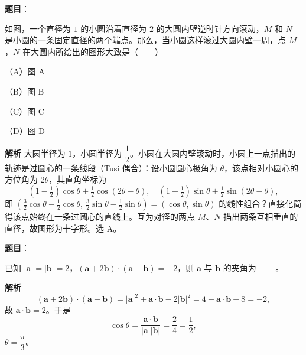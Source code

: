 \begin{answer}

\textbf{题目}：

如图，一个直径为 $1$ 的小圆沿着直径为 $2$ 的大圆内壁逆时针方向滚动，$M$ 和 $N$ 是小圆的一条固定直径的两个端点。那么，当小圆这样滚过大圆内壁一周，点 $M$，$N$ 在大圆内所绘出的图形大致是\mbox{（　　）}

（A）图 A

（B）图 B

（C）图 C

（D）图 D
\nopagebreak[4]
\begin{center}\end{center}
\nopagebreak[4]
\textbf{解析}
大圆半径为 $1$，小圆半径为 $\dfrac12$。小圆在大圆内壁滚动时，小圆上一点描出的轨迹是过圆心的一条线段（Tusi 偶合）：设小圆圆心极角为 $\theta$，该点相对小圆心的方位角为 $2\theta$，其直角坐标为
\nopagebreak[4]
\[(1-\tfrac12)\cos\theta+\tfrac12\cos(2\theta-\theta),\quad (1-\tfrac12)\sin\theta+\tfrac12\sin(2\theta-\theta),\]
即 $\left(\tfrac32\cos\theta-\tfrac12\cos\theta,\ \tfrac32\sin\theta-\tfrac12\sin\theta\right)=(\cos\theta,\sin\theta)$ 的线性组合？直接化简得该点始终在一条过圆心的直线上。互为对径的两点 $M$、$N$ 描出两条互相垂直的直径，故图形为十字形。选 A。


\end{answer}
\begin{answer}

\textbf{题目}：

已知 $|\boldsymbol a|=|\boldsymbol b|=2$，$(\boldsymbol a+2\boldsymbol b)\cdot(\boldsymbol a-\boldsymbol b)=-2$，则 $\boldsymbol a$ 与 $\boldsymbol b$ 的夹角为 $\underline{\qquad}$。

\textbf{解析}
\nopagebreak[4]
\[(\boldsymbol a+2\boldsymbol b)\cdot(\boldsymbol a-\boldsymbol b)=|\boldsymbol a|^2+\boldsymbol a\cdot\boldsymbol b-2|\boldsymbol b|^2=4+\boldsymbol a\cdot\boldsymbol b-8=-2,\]
故 $\boldsymbol a\cdot\boldsymbol b=2$。于是
\nopagebreak[4]
\[\cos\theta=\frac{\boldsymbol a\cdot\boldsymbol b}{|\boldsymbol a||\boldsymbol b|}=\frac{2}{4}=\frac12,\]
$\theta=\dfrac\pi3$。


\end{answer}
